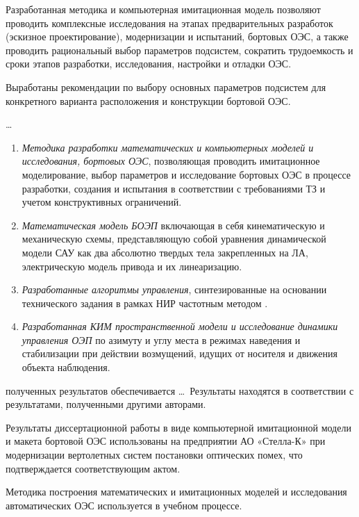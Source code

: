 {\influence} 

Разработанная методика и компьютерная имитационная модель позволяют проводить комплексные исследования на этапах предварительных разработок (эскизное проектирование), модернизации и испытаний, бортовых ОЭС, а также проводить рациональный выбор параметров подсистем, сократить трудоемкость и сроки этапов разработки, исследования, настройки и отладки ОЭС.

Выработаны рекомендации по выбору основных параметров подсистем для конкретного варианта расположения и конструкции бортовой ОЭС.

{\methods} \ldots

{}
\begin{enumerate}
  \item \textit{Методика разработки математических и компьютерных моделей и исследования, бортовых ОЭС}, позволяющая проводить имитационное моделирование, выбор параметров и исследование бортовых ОЭС в процессе разработки, создания и испытания в соответствии с требованиями ТЗ и учетом конструктивных ограничений. 
  \item \textit{Математическая модель БОЭП} включающая в себя кинематическую и механическую схемы, представляющую собой уравнения динамической модели САУ как два абсолютно твердых тела закрепленных на ЛА, электрическую модель привода и их линеаризацию.
  \item \textit{Разработанные алгоритмы управления}, синтезированные на основании технического задания в рамках НИР частотным методом \cite[]{Babaev}.
  \item \textit{Разработанная КИМ пространственной модели и исследование динамики управления ОЭП} по азимуту и углу места в режимах наведения и стабилизации при действии возмущений, идущих от носителя и движения объекта наблюдения.
\end{enumerate}

{\reliability} полученных результатов обеспечивается \ldots \ Результаты находятся в соответствии с результатами, полученными другими авторами.


{\probation}
Результаты диссертационной работы в виде компьютерной имитационной модели и макета бортовой ОЭС использованы на предприятии АО «Стелла-К» при модернизации вертолетных систем постановки оптических помех, что подтверждается соответствующим актом.

Методика построения математических и имитационных моделей и исследования автоматических ОЭС используется в учебном процессе.

